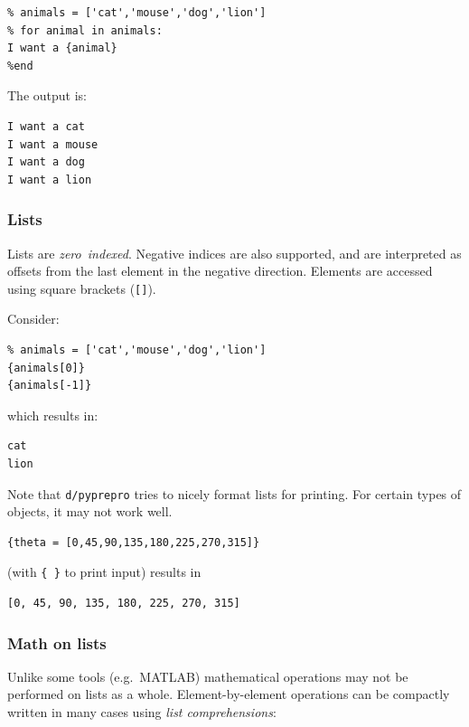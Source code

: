 {\begin{verbatim}
% animals = ['cat','mouse','dog','lion']
% for animal in animals:
I want a {animal}
%end
\end{verbatim}

The output is:

\begin{verbatim}
I want a cat
I want a mouse
I want a dog
I want a lion
\end{verbatim}

\subsubsection{Lists}\label{interfaces:lists}

Lists are \emph{zero\ indexed}. Negative indices are also supported, and
are interpreted as offsets from the last element in the negative direction. 
Elements are accessed using square brackets (\texttt{[]}).

Consider:

\begin{verbatim}
% animals = ['cat','mouse','dog','lion']
{animals[0]}
{animals[-1]}
\end{verbatim}

which results in:

\begin{verbatim}
cat
lion
\end{verbatim}

Note that \texttt{d/pyprepro} tries to nicely format lists for printing.
For certain types of objects, it may not work well.

\begin{verbatim}
{theta = [0,45,90,135,180,225,270,315]}
\end{verbatim}

(with \texttt{\{\ \}} to print input) results in

\begin{verbatim}
[0, 45, 90, 135, 180, 225, 270, 315]
\end{verbatim}

\subsubsection{Math on lists}\label{interfaces:math-on-lists}

Unlike some tools (e.g.~MATLAB) mathematical operations may not be performed
on lists as a whole. Element-by-element operations can be compactly written in 
many cases using \emph{list comprehensions}:

}
